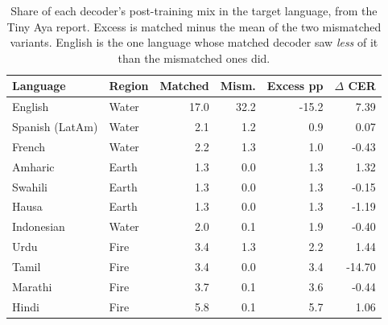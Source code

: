 \begin{table}[t]
\centering
\setlength{\tabcolsep}{4pt}
\begin{tabular}{@{}llrrrr@{}}
\toprule
\textbf{Language} & \textbf{Region} & \textbf{Matched} & \textbf{Mism.} & \textbf{Excess pp} & \textbf{$\Delta$ CER} \\
\midrule
English & Water & 17.0 & 32.2 & -15.2 & 7.39 \\
Spanish (LatAm) & Water & 2.1 & 1.2 & 0.9 & 0.07 \\
French & Water & 2.2 & 1.3 & 1.0 & -0.43 \\
Amharic & Earth & 1.3 & 0.0 & 1.3 & 1.32 \\
Swahili & Earth & 1.3 & 0.0 & 1.3 & -0.15 \\
Hausa & Earth & 1.3 & 0.0 & 1.3 & -1.19 \\
Indonesian & Water & 2.0 & 0.1 & 1.9 & -0.40 \\
Urdu & Fire & 3.4 & 1.3 & 2.2 & 1.44 \\
Tamil & Fire & 3.4 & 0.0 & 3.4 & -14.70 \\
Marathi & Fire & 3.7 & 0.1 & 3.6 & -0.44 \\
Hindi & Fire & 5.8 & 0.1 & 5.7 & 1.06 \\
\bottomrule
\end{tabular}
\caption{Share of each decoder's post-training mix in the target language, from the Tiny Aya report. Excess is matched minus the mean of the two mismatched variants. English is the one language whose matched decoder saw \emph{less} of it than the mismatched ones did.}
\label{tab:exposure}
\end{table}
